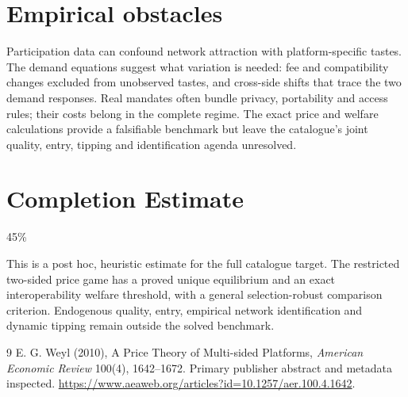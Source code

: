\documentclass[11pt]{article}
\begin{document}
\section*{Empirical obstacles}
Participation data can confound network attraction with platform-specific tastes. The demand equations suggest what variation is needed: fee and compatibility changes excluded from unobserved tastes, and cross-side shifts that trace the two demand responses. Real mandates often bundle privacy, portability and access rules; their costs belong in the complete regime. The exact price and welfare calculations provide a falsifiable benchmark but leave the catalogue's joint quality, entry, tipping and identification agenda unresolved.

\section{Completion Estimate}
45\%

This is a post hoc, heuristic estimate for the full catalogue target.
The restricted two-sided price game has a proved unique equilibrium and an exact interoperability welfare threshold, with a general selection-robust comparison criterion. Endogenous quality, entry, empirical network identification and dynamic tipping remain outside the solved benchmark.

\begin{thebibliography}{9}
 E. G. Weyl (2010), A Price Theory of Multi-sided Platforms, \emph{American Economic Review} 100(4), 1642--1672. Primary publisher abstract and metadata inspected. \url{https://www.aeaweb.org/articles?id=10.1257/aer.100.4.1642}.
\end{thebibliography}
\end{document}

